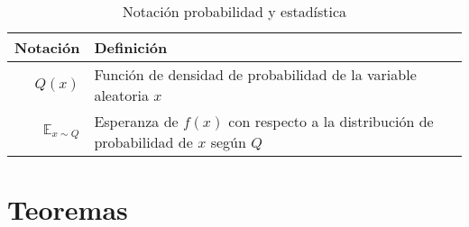 \begin{table}[H]
    \begin{center}
        \begin{tabularx}{\textwidth}{|r|X|}
            \hline
            \textbf{Notación}         & \textbf{Definición}                                                                     \\
            \hline %
            ${Q(x)}$                  & Función de densidad de probabilidad de la variable aleatoria ${x}$                      \\
            ${\mathbb{E}_{x \sim Q}}$ & Esperanza de $f(x)$ con respecto a la distribución de probabilidad de ${x}$ según ${Q}$ \\

            \hline
        \end{tabularx}
        \caption{Notación probabilidad y estadística}
        \label{tab:notation-p-e}
    \end{center}
\end{table}









\chapter*{Teoremas}

